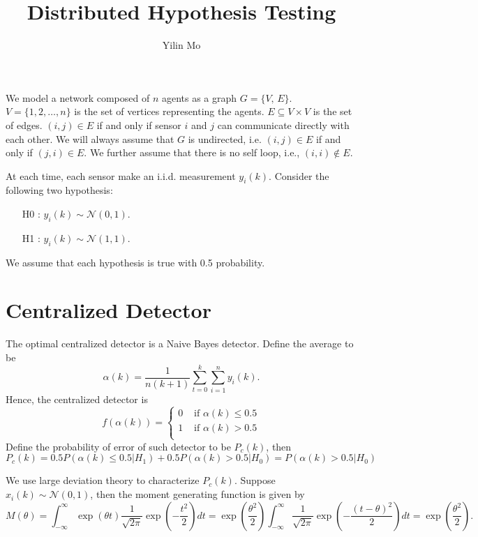 \documentclass{article}
\title{Distributed Hypothesis Testing}
\author{Yilin Mo}
\begin{document}
 \maketitle

We model a network composed of $n$ agents as a graph $G = \{V,\,E\}$. $V = \{1,2,\ldots,n\}$ is the set of vertices representing the agents. $E \subseteq V\times V$ is the set of edges. $(i,j)\in E$ if and only if sensor $i$ and $j$ can communicate directly with each other. We will always assume that $G$ is undirected, i.e. $(i,j)\in E$ if and only if $(j,i)\in E$. We further assume that there is no self loop, i.e., $(i,i)\notin E$.

At each time, each sensor make an i.i.d. measurement $y_i(k)$. Consider the following two hypothesis:
\begin{itemize}
  \item[H0]: $y_i(k) \sim \mathcal N(0,1)$.
  \item[H1]: $y_i(k) \sim \mathcal N(1,1)$.
\end{itemize}
We assume that each hypothesis is true with 0.5 probability.

\section{Centralized Detector}
The optimal centralized detector is a Naive Bayes detector. Define the average to be
\begin{displaymath}
  \alpha(k) = \frac{1}{n(k+1)}\sum_{t=0}^k \sum_{i=1}^n y_i(k).
\end{displaymath}
Hence, the centralized detector is
\begin{displaymath}
  f(\alpha(k)) = \begin{cases}
    0&\text{ if }\alpha(k)\leq 0.5\\
    1&\text{ if }\alpha(k)> 0.5\\
  \end{cases}
\end{displaymath}
Define the probability of error of such detector to be $P_c(k)$, then
\begin{displaymath}
 P_c(k) = 0.5 P(\alpha(k)\leq 0.5|H_1) + 0.5 P(\alpha(k)> 0.5|H_0) = P(\alpha(k)> 0.5|H_0)
\end{displaymath}

We use large deviation theory to characterize $P_c(k)$. Suppose $x_i(k)\sim \mathcal N(0,1)$, then the moment generating function is given by
\begin{displaymath}
  M(\theta) = \int_{-\infty}^\infty \exp(\theta t) \frac{1}{\sqrt{2\pi}}\exp\left( -\frac{t^2}{2} \right)dt =  \exp\left( \frac{\theta^2}{2} \right)\int_{-\infty}^\infty  \frac{1}{\sqrt{2\pi}}\exp\left( -\frac{(t-\theta)^2}{2} \right)dt  = \exp\left( \frac{\theta^2}{2} \right).
\end{displaymath}
\end{document}

